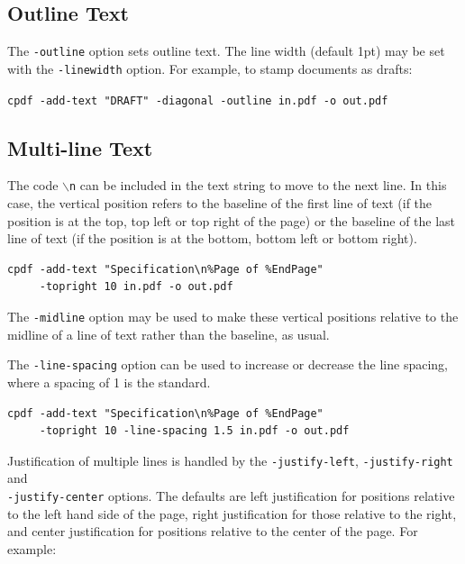 \documentclass{book}
\begin{document}
\subsection{Outline Text}

  The \texttt{-outline} option sets outline text. The line width (default 1pt)
  may be set with the \texttt{-linewidth} option. For example, to stamp
  documents as drafts:

  \begin{framed}
    \noindent\small\verb!cpdf -add-text "DRAFT" -diagonal -outline in.pdf -o out.pdf!
    
  \end{framed}

\subsection{Multi-line Text}

The code \texttt{$\backslash$n} can be included in the text string to move to
the next line. In this case, the vertical position refers to the baseline of
the first line of text (if the position is at the top, top left or top right of
the page) or the baseline of the last line of text (if the position is at the
bottom, bottom left or bottom right).

  \begin{framed}
    \noindent\small\begin{verbatim}cpdf -add-text "Specification\n%Page of %EndPage"
     -topright 10 in.pdf -o out.pdf\end{verbatim}
  \end{framed}

\noindent The \texttt{-midline} option may be used to make these vertical positions
relative to the midline of a line of text rather than the baseline, as usual.

The \texttt{-line-spacing} option can be used to increase or decrease the line
spacing, where a spacing of 1 is the standard.

  \begin{framed}
    \noindent\small\begin{verbatim}cpdf -add-text "Specification\n%Page of %EndPage"
     -topright 10 -line-spacing 1.5 in.pdf -o out.pdf\end{verbatim}
  \end{framed}

\noindent Justification of multiple lines is handled by the \texttt{-justify-left}, 
\texttt{-justify-right} and\\ \texttt{-justify-center} options. The defaults are
left justification for positions relative to the left hand side of the page,
right justification for those relative to the right, and center justification
for positions relative to the center of the page. For example:
\end{document}
